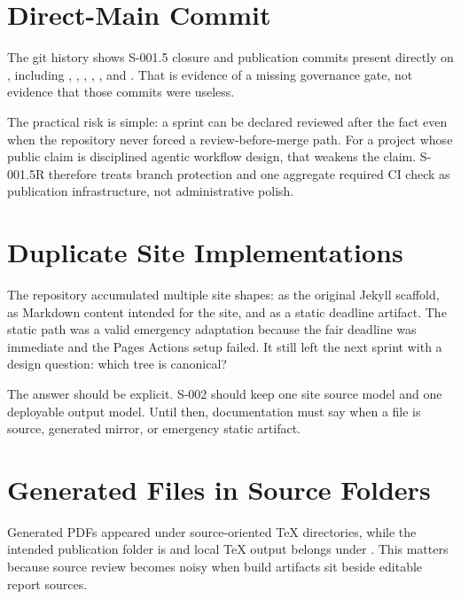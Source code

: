 \documentclass[a4paper,11pt,openany]{report}
\begin{document}

\section{Direct-Main Commit}

The git history shows S-001.5 closure and publication commits present directly
on , including , , ,
, , and . That is evidence of a
missing governance gate, not evidence that those commits were useless.

The practical risk is simple: a sprint can be declared reviewed after the fact
even when the repository never forced a review-before-merge path. For a project
whose public claim is disciplined agentic workflow design, that weakens the
claim. S-001.5R therefore treats branch protection and one aggregate required
CI check as publication infrastructure, not administrative polish.

\section{Duplicate Site Implementations}

The repository accumulated multiple site shapes:
 as the original Jekyll scaffold,
 as Markdown content intended for the site, and
 as a static deadline artifact. The static path was a
valid emergency adaptation because the fair deadline was immediate and the
Pages Actions setup failed. It still left the next sprint with a design
question: which tree is canonical?

The answer should be explicit. S-002 should keep one site source model and one
deployable output model. Until then, documentation must say when a file is
source, generated mirror, or emergency static artifact.

\section{Generated Files in Source Folders}

Generated PDFs appeared under source-oriented TeX directories, while the
intended publication folder is  and local TeX
output belongs under . This matters because
source review becomes noisy when build artifacts sit beside editable report
sources.
\end{document}

